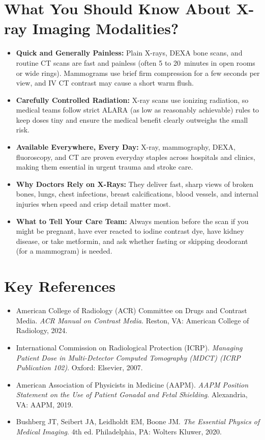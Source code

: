 \section{What You Should Know About X-ray Imaging Modalities?}
\begin{itemize}
  \item \textbf{Quick and Generally Painless:} Plain X-rays, DEXA bone scans, and routine CT scans are fast and painless (often 5 to 20~minutes in open rooms or wide rings). Mammograms use brief firm compression for a few seconds per view, and IV CT contrast may cause a short warm flush.
  \item \textbf{Carefully Controlled Radiation:} X-ray scans use ionizing radiation, so medical teams follow strict ALARA (as low as reasonably achievable) rules to keep doses tiny and ensure the medical benefit clearly outweighs the small risk.
  \item \textbf{Available Everywhere, Every Day:} X-ray, mammography, DEXA, fluoroscopy, and CT are proven everyday staples across hospitals and clinics, making them essential in urgent trauma and stroke care.
  \item \textbf{Why Doctors Rely on X-Rays:} They deliver fast, sharp views of broken bones, lungs, chest infections, breast calcifications, blood vessels, and internal injuries when speed and crisp detail matter most.
  \item \textbf{What to Tell Your Care Team:} Always mention before the scan if you might be pregnant, have ever reacted to iodine contrast dye, have kidney disease, or take metformin, and ask whether fasting or skipping deodorant (for a mammogram) is needed.
\end{itemize}

\section{Key References}
\begin{itemize}
  \item American College of Radiology (ACR) Committee on Drugs and Contrast Media. \emph{ACR Manual on Contrast Media}. Reston, VA: American College of Radiology, 2024.
  \item International Commission on Radiological Protection (ICRP). \emph{Managing Patient Dose in Multi-Detector Computed Tomography (MDCT) (ICRP Publication 102)}. Oxford: Elsevier, 2007.
  \item American Association of Physicists in Medicine (AAPM). \emph{AAPM Position Statement on the Use of Patient Gonadal and Fetal Shielding}. Alexandria, VA: AAPM, 2019.
  \item Bushberg JT, Seibert JA, Leidholdt EM, Boone JM. \emph{The Essential Physics of Medical Imaging}. 4th ed. Philadelphia, PA: Wolters Kluwer, 2020.
\end{itemize}
